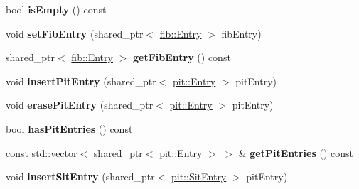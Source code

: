 \begin{DoxyCompactItemize}
\item 
bool {\bfseries is\+Empty} () const\hypertarget{classnfd_1_1name__tree_1_1Entry_a98cec6d4d1cea81db92a7469739a223d}{}\label{classnfd_1_1name__tree_1_1Entry_a98cec6d4d1cea81db92a7469739a223d}

\item 
void {\bfseries set\+Fib\+Entry} (shared\+\_\+ptr$<$ \hyperlink{classnfd_1_1fib_1_1Entry}{fib\+::\+Entry} $>$ fib\+Entry)\hypertarget{classnfd_1_1name__tree_1_1Entry_af8cdbd90fe7153d46f5c481a70bfec3a}{}\label{classnfd_1_1name__tree_1_1Entry_af8cdbd90fe7153d46f5c481a70bfec3a}

\item 
shared\+\_\+ptr$<$ \hyperlink{classnfd_1_1fib_1_1Entry}{fib\+::\+Entry} $>$ {\bfseries get\+Fib\+Entry} () const\hypertarget{classnfd_1_1name__tree_1_1Entry_a2bffe5a77db5482f25b46a10119719c1}{}\label{classnfd_1_1name__tree_1_1Entry_a2bffe5a77db5482f25b46a10119719c1}

\item 
void {\bfseries insert\+Pit\+Entry} (shared\+\_\+ptr$<$ \hyperlink{classnfd_1_1pit_1_1Entry}{pit\+::\+Entry} $>$ pit\+Entry)\hypertarget{classnfd_1_1name__tree_1_1Entry_a3afeeb876b74b1bd895528e8391e56fc}{}\label{classnfd_1_1name__tree_1_1Entry_a3afeeb876b74b1bd895528e8391e56fc}

\item 
void {\bfseries erase\+Pit\+Entry} (shared\+\_\+ptr$<$ \hyperlink{classnfd_1_1pit_1_1Entry}{pit\+::\+Entry} $>$ pit\+Entry)\hypertarget{classnfd_1_1name__tree_1_1Entry_a8ee21fd592f677c6e8076f32dcfa0d20}{}\label{classnfd_1_1name__tree_1_1Entry_a8ee21fd592f677c6e8076f32dcfa0d20}

\item 
bool {\bfseries has\+Pit\+Entries} () const\hypertarget{classnfd_1_1name__tree_1_1Entry_a0776884caa40d420e0986ce628e751e3}{}\label{classnfd_1_1name__tree_1_1Entry_a0776884caa40d420e0986ce628e751e3}

\item 
const std\+::vector$<$ shared\+\_\+ptr$<$ \hyperlink{classnfd_1_1pit_1_1Entry}{pit\+::\+Entry} $>$ $>$ \& {\bfseries get\+Pit\+Entries} () const\hypertarget{classnfd_1_1name__tree_1_1Entry_ae2906861ed8fc6571c62a6c3f545f1da}{}\label{classnfd_1_1name__tree_1_1Entry_ae2906861ed8fc6571c62a6c3f545f1da}

\item 
void {\bfseries insert\+Sit\+Entry} (shared\+\_\+ptr$<$ \hyperlink{classnfd_1_1pit_1_1SitEntry}{pit\+::\+Sit\+Entry} $>$ pit\+Entry)\hypertarget{classnfd_1_1name__tree_1_1Entry_a4a3f082d3b3d1071e603b9c638bd739f}{}\label{classnfd_1_1name__tree_1_1Entry_a4a3f082d3b3d1071e603b9c638bd739f}


\end{DoxyCompactItemize}
